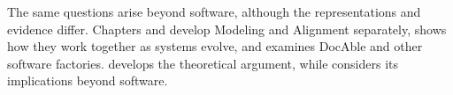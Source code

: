 The same questions arise beyond software, although the representations and evidence differ. Chapters  and  develop Modeling and Alignment separately,  shows how they work together as systems evolve, and  examines DocAble and other software factories.  develops the theoretical argument, while  considers its implications beyond software.
